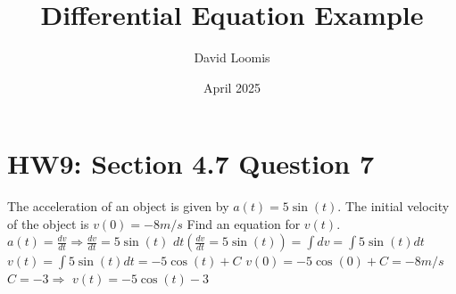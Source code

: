 \documentclass{article}
\title{Differential Equation Example}
\author{David Loomis}
\date{April 2025}
\begin{document}
\maketitle

\section{HW9: Section 4.7 Question 7}
The acceleration of an object is given by
$a(t)=5\sin(t)$. The initial velocity of the object is $v(0)=-8 m/s$
Find an equation for $v(t)$.\newline
$a(t)=\frac{dv}{dt} \Longrightarrow \frac{dv}{dt}=5\sin(t)$\newline
$dt(\frac{dv}{dt}=5\sin(t))=\int dv=\int5\sin(t)dt$ \newline
$v(t)=\int5\sin(t)dt=-5\cos(t)+C$\newline
$v(0)=-5\cos(0)+C=-8m/s$\newline
$C=-3 \Longrightarrow$ $v(t)=-5\cos(t)-3$
\end{document}
